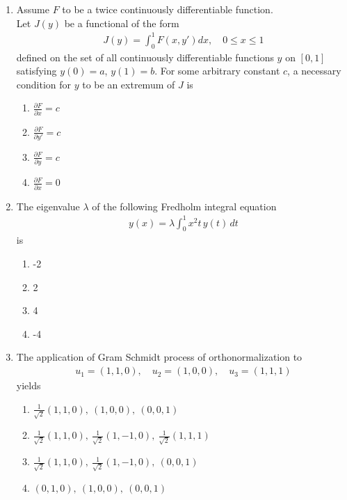 \documentclass[journal]{IEEEtran}
\numberwithin{equation}{enumi}
\numberwithin{figure}{enumi}
\begin{document}
\begin{enumerate}
\item Assume $F$ to be a twice continuously differentiable function.\\
Let $J(y)$ be a functional of the form  \hfill{}
\begin{align*}
J(y) = \int_0^1 F(x, y') dx, \quad 0 \leq x \leq 1
\end{align*}
defined on the set of all continuously differentiable functions $y$ on $[0,1]$ satisfying $y(0) = a$, $y(1) = b$. For some arbitrary constant $c$, a necessary condition for $y$ to be an extremum of $J$ is
\begin{multicols}{4}
\begin{enumerate}
    \item $\frac{\partial F}{\partial x} = c$ \hspace{1cm}
    \item $\frac{\partial F}{\partial y'} = c$ \hspace{1cm}
    \item $\frac{\partial F}{\partial y} = c$ \hspace{1cm}
    \item $\frac{\partial F}{\partial x} = 0$
\end{enumerate}
\end{multicols}


\item The eigenvalue $\lambda$ of the following Fredholm integral equation
\begin{align*}
y(x) = \lambda \int_{0}^{1} x^{2} t \, y(t) \, dt
\end{align*}
is
\hfill{}
\begin{multicols}{4}
\begin{enumerate}
    \item -2
    \item 2
    \item 4
    \item -4
\end{enumerate}
\end{multicols}



\item The application of Gram Schmidt process of orthonormalization to 
\begin{align*}
u_1 = (1,1,0), \quad u_2 = (1,0,0), \quad u_3 = (1,1,1)
\end{align*}
yields
\hfill{}
\begin{multicols}{2}
\begin{enumerate}
    \item $\frac{1}{\sqrt{2}}(1,1,0),\ (1,0,0),\ (0,0,1)$
    \item $\frac{1}{\sqrt{2}}(1,1,0),\ \frac{1}{\sqrt{2}}(1,-1,0),\ \frac{1}{\sqrt{2}}(1,1,1)$
    \item  $\frac{1}{\sqrt{2}}(1,1,0),\ \frac{1}{\sqrt{2}}(1,-1,0),\ (0,0,1)$
    \item  $(0,1,0),\ (1,0,0),\ (0,0,1)$
\end{enumerate}
\end{multicols}




\end{enumerate}
\end{document}
